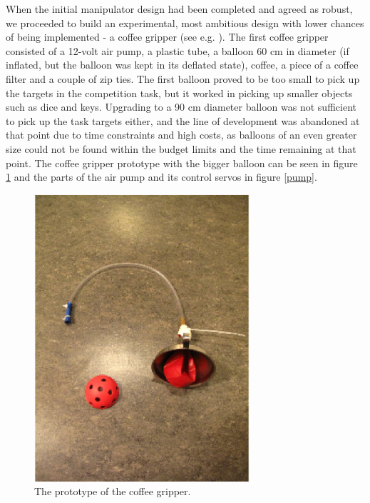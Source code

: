 \documentclass[a4paper,10pt]{article}
\begin{document}
When the initial manipulator design had been completed and agreed as robust, we proceeded to build an experimental, most ambitious design with lower chances of being implemented - a coffee gripper (see e.g. \cite{brown2010universal}). The first coffee gripper consisted of a 12-volt air pump, a plastic tube, a balloon 60 cm in diameter (if inflated, but the balloon was kept in its deflated state), coffee, a piece of a coffee filter and a couple of zip ties. The first balloon proved to be too small to pick up the targets in the competition task, but it worked in picking up smaller objects such as dice and keys. Upgrading to a 90 cm diameter balloon was not sufficient to pick up the task targets either, and the line of development was abandoned at that point due to time constraints and high costs, as balloons of an even greater size could not be found within the budget limits and the time remaining at that point. The coffee gripper prototype with the bigger balloon can be seen in figure \ref{coffee} and the parts of the air pump and its control servos in figure \ref{pump}.

\begin{figure}[h]	%
\begin{center}
\includegraphics[width=8.0cm]{coffee.eps}
\caption{The prototype of the coffee gripper.}
\label{coffee} %
\end{center}
\end{figure}
\end{document}
